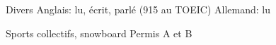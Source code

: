 \begin{rubric}{Divers}
	\entry*[Langues~~~~~~~~~~~~~~~~~~~~~~] Anglais: lu, écrit, parlé (915 au TOEIC)
	\entry* Allemand: lu

	\entry*[Loisirs] Sports collectifs, snowboard
	\entry* Permis A et B
\end{rubric}
